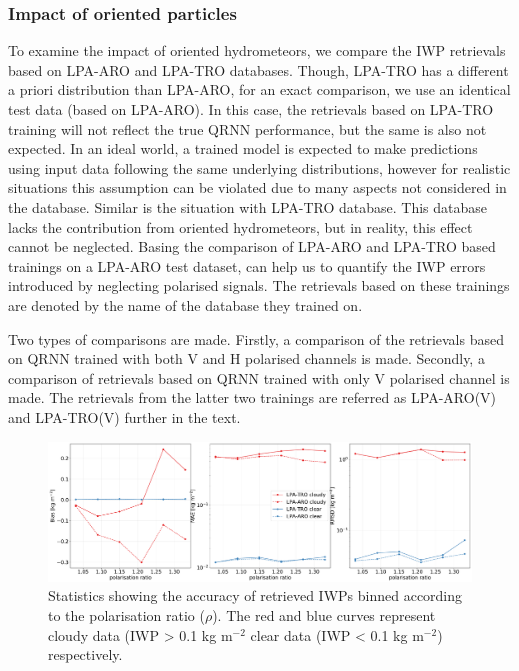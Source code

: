 \documentclass[amt, manuscript]{copernicus}
\begin{document}
\subsubsection{Impact of oriented particles}
\label{sec:impact_retrieval}
%
To examine the impact of oriented hydrometeors, we compare the IWP retrievals based on LPA-ARO and LPA-TRO databases. Though, LPA-TRO has a different a priori distribution than LPA-ARO, for an exact comparison, we use an identical test data (based on LPA-ARO). In this case, the retrievals based on LPA-TRO training will not reflect the true QRNN performance, but the same is also not expected. In an ideal world, a trained model is expected to make predictions using input data following the same underlying distributions, however for realistic situations this assumption can be violated due to many aspects not considered in the database. Similar is the situation with LPA-TRO database. This database lacks the contribution from oriented hydrometeors, but in reality, this effect cannot be neglected. Basing the comparison of LPA-ARO and LPA-TRO based trainings on a LPA-ARO test dataset, can help us to quantify the IWP errors introduced by neglecting polarised signals. The retrievals based on these trainings are denoted by the name of the database they trained on.

Two types of comparisons are made. Firstly, a comparison of the retrievals based on QRNN trained with both V  and H  polarised channels  is made. Secondly, a comparison of retrievals based on QRNN trained with only V  polarised channel is made. The retrievals from the latter two trainings are referred as LPA-ARO(V) and LPA-TRO(V) further in the text.  


\begin{figure}[t]
	\includegraphics[width=12cm]{Figures/statistics_cloudyclear.pdf}
	\caption{Statistics showing the accuracy of retrieved IWPs
		binned according to the polarisation ratio ($\rho$). The red and blue curves represent cloudy data (IWP > 0.1\,\,kg m$^{-2}$
		clear data (IWP < 0.1\,\,kg m$^{-2}$) respectively.}
	\label{fig:clear_cloudy}
\end{figure}
\end{document}
